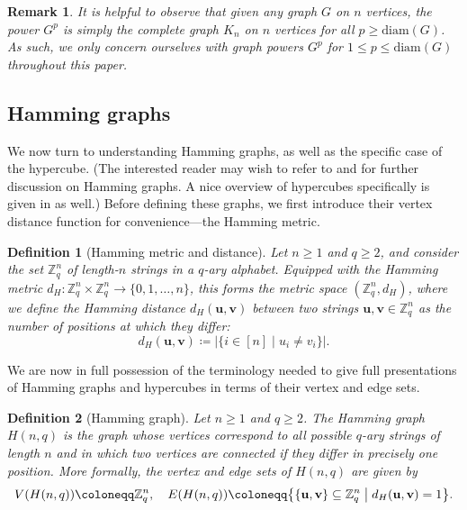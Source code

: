 \documentclass{article}
\def\Z{\mathbb{Z}}
\def\u{\mathbf{u}}
\def\vv{\mathbf{v}} %
\numberwithin{equation}{section}
\theoremstyle{plain}
\newtheorem{remark}[theorem]{Remark}
\newtheorem{definition}{Definition}
\begin{document}
\begin{remark}\label{remark:2.1}
    It is helpful to observe that given any graph $G$ on $n$ vertices, the power $G^p$ is simply the complete graph $K_n$ on $n$ vertices for all $p \ge \mathrm{diam}(G)$. As such, we only concern ourselves with graph powers $G^p$ for $1 \le p \le \mathrm{diam}(G)$ throughout this paper.
\end{remark}

\subsection{Hamming graphs}\label{subsection:2.1}

We now turn to understanding Hamming graphs, as well as the specific case of the hypercube. (The interested reader may wish to refer to \cite[pp. 261--267]{BCN89} and \cite[pp. 167--168]{HIK11} for further discussion on Hamming graphs. A nice overview of hypercubes specifically is given in \cite[pp. 17--18]{HIK11} as well.) Before defining these graphs, we first introduce their vertex distance function for convenience---the Hamming metric.

\begin{definition}[Hamming metric and distance]\label{defn:2}
    Let $n \ge 1$ and $q \ge 2$, and consider the set $\Z_q^n$ of length-$n$ strings in a $q$-ary alphabet. Equipped with the \emph{Hamming metric} $d_H : \Z_q^n \times \Z_q^n \to \{0, 1, \ldots, n\}$, this forms the metric space $(\Z_q^n, d_H)$, where we define the \emph{Hamming distance} $d_H(\u, \vv)$ between two strings $\u, \vv \in \Z_q^n$ as the number of positions at which they differ:
    \[d_H(\u, \vv) \coloneqq \lvert \{i \in [n] \mid u_i \ne v_i\} \rvert.\]
\end{definition}

We are now in full possession of the terminology needed to give full presentations of Hamming graphs and hypercubes in terms of their vertex and edge sets.

\begin{definition}[Hamming graph]\label{defn:3}
    Let $n \ge 1$ and $q \ge 2$. The \emph{Hamming graph} $H(n, q)$ is the graph whose vertices correspond to all possible $q$-ary strings of length $n$ and in which two vertices are connected if they differ in precisely one position. More formally, the vertex and edge sets of $H(n, q)$ are given by
    \[V(H(n, q)) \coloneqq \Z_q^n, \quad E(H(n, q)) \coloneqq \bigl\{\{\u, \vv\} \subseteq \Z_q^n \bigm| d_H(\u, \vv) = 1\bigr\}.\]
\end{definition}
\end{document}
